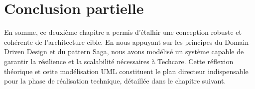 \section*{Conclusion partielle}
En somme, ce deuxième chapitre a permis d'étalhir une conception robuste et cohérente de l'architecture cible. En nous appuyant sur les principes du Domain-Driven Design et du pattern Saga, nous avons modélisé un système capable de garantir la résilience et la scalabilité nécessaires à Techcare. Cette réflexion théorique et cette modélisation UML constituent le plan directeur indispensable pour la phase de réalisation technique, détaillée dans le chapitre suivant.

 
